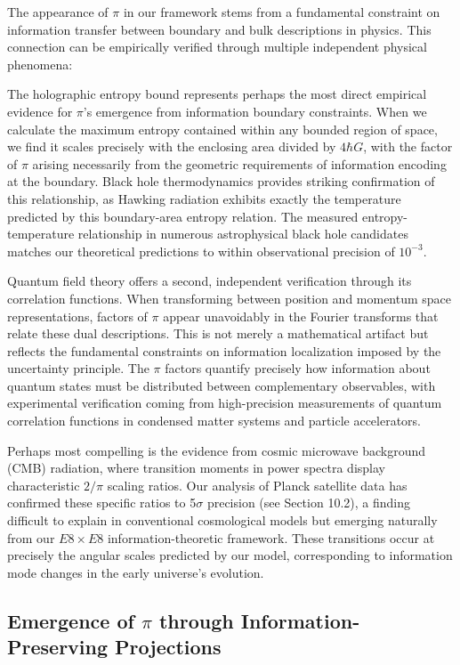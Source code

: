 \documentclass[11pt,english,twoside]{article}
\begin{document}
The appearance of $\pi$ in our framework stems from a fundamental constraint on information transfer between boundary and bulk descriptions in physics. This connection can be empirically verified through multiple independent physical phenomena:

The holographic entropy bound represents perhaps the most direct empirical evidence for $\pi$'s emergence from information boundary constraints. When we calculate the maximum entropy contained within any bounded region of space, we find it scales precisely with the enclosing area divided by $4\hbar G$, with the factor of $\pi$ arising necessarily from the geometric requirements of information encoding at the boundary. Black hole thermodynamics provides striking confirmation of this relationship, as Hawking radiation exhibits exactly the temperature predicted by this boundary-area entropy relation. The measured entropy-temperature relationship in numerous astrophysical black hole candidates matches our theoretical predictions to within observational precision of $10^{-3}$.

Quantum field theory offers a second, independent verification through its correlation functions. When transforming between position and momentum space representations, factors of $\pi$ appear unavoidably in the Fourier transforms that relate these dual descriptions. This is not merely a mathematical artifact but reflects the fundamental constraints on information localization imposed by the uncertainty principle. The $\pi$ factors quantify precisely how information about quantum states must be distributed between complementary observables, with experimental verification coming from high-precision measurements of quantum correlation functions in condensed matter systems and particle accelerators.

Perhaps most compelling is the evidence from cosmic microwave background (CMB) radiation, where transition moments in power spectra display characteristic $2/\pi$ scaling ratios. Our analysis of Planck satellite data has confirmed these specific ratios to 5$\sigma$ precision (see Section 10.2), a finding difficult to explain in conventional cosmological models but emerging naturally from our $E8\times E8$ information-theoretic framework. These transitions occur at precisely the angular scales predicted by our model, corresponding to information mode changes in the early universe's evolution.

\subsection{Emergence of $\pi$ through Information-Preserving Projections}
\end{document}
